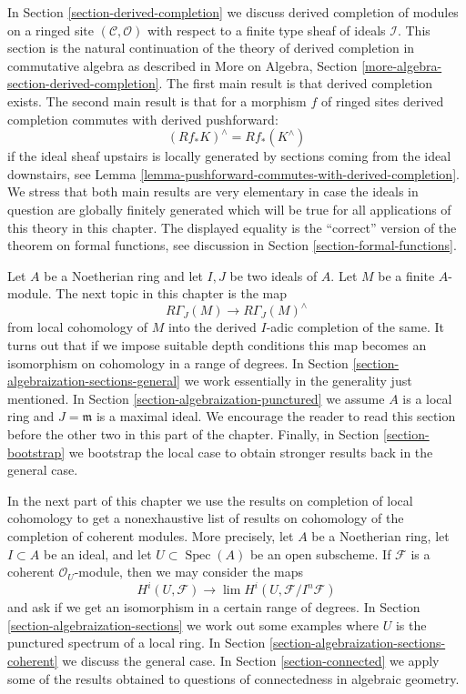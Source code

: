 \documentclass{stacks-project}
\theoremstyle{plain}
\theoremstyle{definition}
\theoremstyle{remark}
\numberwithin{equation}{subsection}
\def\lim{\mathop{\mathrm{lim}}\nolimits}
\def\Spec{\mathop{\mathrm{Spec}}}
\begin{document}
\medskip\noindent
In Section \ref{section-derived-completion} we discuss derived completion
of modules on a ringed site $(\mathcal{C}, \mathcal{O})$
with respect to a finite type sheaf of ideals $\mathcal{I}$.
This section is the natural continuation of the theory of derived completion
in commutative algebra as described in
More on Algebra, Section \ref{more-algebra-section-derived-completion}.
The first main result is that derived completion exists.
The second main result is that for a morphism $f$ of ringed sites
derived completion commutes with derived pushforward:
$$
(Rf_*K)^\wedge = Rf_*(K^\wedge)
$$
if the ideal sheaf upstairs is locally generated by sections coming
from the ideal downstairs, see
Lemma \ref{lemma-pushforward-commutes-with-derived-completion}.
We stress that both main results are very elementary in case the
ideals in question are globally finitely generated which will
be true for all applications of this theory in this chapter.
The displayed equality is the ``correct'' version of the
theorem on formal functions, see discussion in
Section \ref{section-formal-functions}.

\medskip\noindent
Let $A$ be a Noetherian ring and let $I, J$ be two ideals of $A$.
Let $M$ be a finite $A$-module.
The next topic in this chapter is the map
$$
R\Gamma_J(M) \longrightarrow R\Gamma_J(M)^\wedge
$$
from local cohomology of $M$ into the derived $I$-adic completion
of the same. It turns out that if we impose suitable depth conditions
this map becomes an isomorphism on cohomology in a range of degrees.
In Section \ref{section-algebraization-sections-general}
we work essentially in the generality just mentioned.
In Section \ref{section-algebraization-punctured}
we assume $A$ is a local ring and $J = \mathfrak m$ is a maximal ideal.
We encourage the reader to read this section before the other two in
this part of the chapter.
Finally, in Section \ref{section-bootstrap} we bootstrap
the local case to obtain stronger results back in the general case.

\medskip\noindent
In the next part of this chapter we use the results on
completion of local cohomology to get a nonexhaustive list of results on
cohomology of the completion of coherent modules.
More precisely, let $A$ be a Noetherian ring, let $I \subset A$
be an ideal, and let $U \subset \Spec(A)$ be an open subscheme.
If $\mathcal{F}$ is a coherent $\mathcal{O}_U$-module, then
we may consider the maps
$$
H^i(U, \mathcal{F}) \longrightarrow \lim H^i(U, \mathcal{F}/I^n\mathcal{F})
$$
and ask if we get an isomorphism in a certain range of degrees.
In Section \ref{section-algebraization-sections}
we work out some examples where $U$ is the punctured spectrum
of a local ring. In Section \ref{section-algebraization-sections-coherent}
we discuss the general case.
In Section \ref{section-connected} we apply some of the results
obtained to questions of connectedness in algebraic geometry.
\end{document}
